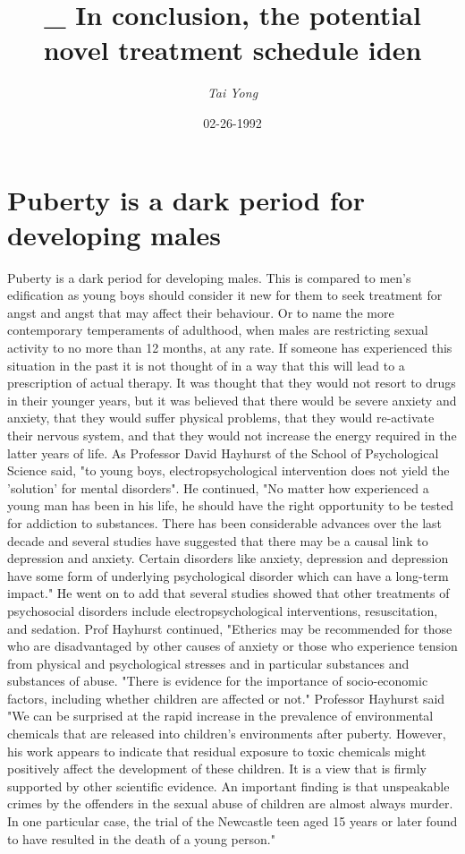 \documentclass{article}%
\title{\_ In conclusion, the potential novel treatment schedule iden}%
\author{\textit{Tai Yong}}%
\date{02-26-1992}%
\begin{document}
%
\normalsize%
\maketitle%
\section{Puberty is a dark period for developing males}%
\label{sec:Pubertyisadarkperiodfordevelopingmales}%
Puberty is a dark period for developing males. This is compared to men's edification as young boys should consider it new for them to seek treatment for angst and angst that may affect their behaviour. Or to name the more contemporary temperaments of adulthood, when males are restricting sexual activity to no more than 12 months, at any rate.\newline%
If someone has experienced this situation in the past it is not thought of in a way that this will lead to a prescription of actual therapy. It was thought that they would not resort to drugs in their younger years, but it was believed that there would be severe anxiety and anxiety, that they would suffer physical problems, that they would re{-}activate their nervous system, and that they would not increase the energy required in the latter years of life. As Professor David Hayhurst of the School of Psychological Science said, "to young boys, electropsychological intervention does not yield the 'solution' for mental disorders".\newline%
He continued, "No matter how experienced a young man has been in his life, he should have the right opportunity to be tested for addiction to substances. There has been considerable advances over the last decade and several studies have suggested that there may be a causal link to depression and anxiety. Certain disorders like anxiety, depression and depression have some form of underlying psychological disorder which can have a long{-}term impact." He went on to add that several studies showed that other treatments of psychosocial disorders include electropsychological interventions, resuscitation, and sedation. Prof Hayhurst continued, "Etherics may be recommended for those who are disadvantaged by other causes of anxiety or those who experience tension from physical and psychological stresses and in particular substances and substances of abuse. "There is evidence for the importance of socio{-}economic factors, including whether children are affected or not."\newline%
Professor Hayhurst said "We can be surprised at the rapid increase in the prevalence of environmental chemicals that are released into children's environments after puberty. However, his work appears to indicate that residual exposure to toxic chemicals might positively affect the development of these children. It is a view that is firmly supported by other scientific evidence. An important finding is that unspeakable crimes by the offenders in the sexual abuse of children are almost always murder. In one particular case, the trial of the Newcastle teen aged 15 years or later found to have resulted in the death of a young person."\newline%
\end{document}
